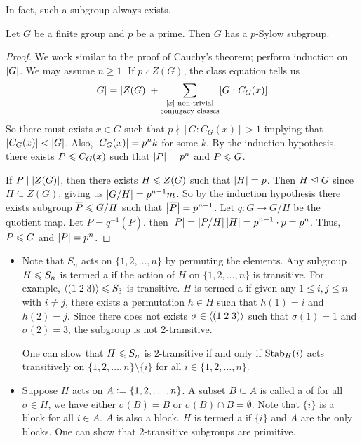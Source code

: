 In fact, such a subgroup always exists.

\begin{theorem}
    Let $G$ be a finite group and $p$ be a prime. Then $G$ has a $p$-Sylow subgroup.
\end{theorem}

\begin{proof}
    We work similar to the proof of Cauchy's theorem; perform induction on $\left| G \right|$. We may assume $n \geq 1$. If $p \nmid Z(G)$, the class equation tells us 
    \begin{align}
        \left| G \right| = \left| Z(G) \right| + \sum_{\substack{[x] \text{ non-trivial}\\ \text{conjugacy classes}}} [G:C_G(x)].
    \end{align}
    So there must exists $x \in G$ such that $p \nmid [G:C_G(x)] > 1$ implying that $\left| C_{G}(x) \right| < \left| G \right|$. Also, $\left| C_{G}(x) \right| = p^{n}k$ for some $k$. By the induction hypothesis, there exists $P \leqslant C_{G}(x)$ such that $\left| P \right| = p^{n}$ and $P \leqslant G$.

    If $P \mid \left| Z(G) \right|$, then there exists $H \leqslant Z(G)$ such that $\left| H \right| = p$. Then $H \trianglelefteq G$ since $H \subseteq Z(G)$, giving us $\left| G/H \right| = p^{n-1}m$. So by the induction hypothesis there exists subgroup $\overline{P} \leqslant G/H$ such that $\left| \overline{P} \right| = p^{n-1}$. Let $q:G \to G/H$ be the quotient map. Let $P = q^{-1}(\overline{P})$. then $\left| P \right| = \left| P/H \right|\left| H \right| = p^{n-1} \cdot p = p^{n}$. Thus, $P \leqslant G$ and $\left| P \right| = p^{n}$.
\end{proof}


\begin{remark}
    \begin{itemize}
        \item Note that $S_{n}$ acts on $\{1,2,\ldots,n\}$ by permuting the elements. Any subgroup $H \leqslant S_{n}$ is termed a  if the action of $H$ on $\{1,2,\ldots,n\}$ is transitive. For example, $\langle(1\;2\;3)\rangle \leqslant S_{3}$ is transitive. $H$ is termed a  if given any $1 \leq i,j \leq n$ with $i \neq j$, there exists a permutation $h \in H$ such that $h(1) = i$ and $h(2) = j$. Since there does not exists $\sigma \in \langle(1\;2\;3)\rangle$ such that $\sigma(1) = 1$ and $\sigma(2) = 3$, the subgroup is not 2-transitive.

        One can show that $H \leqslant S_{n}$ is 2-transitive if and only if $\operatorname{Stab}_{H}(i)$ acts transitively on $\{1,2,\ldots,n\} \setminus \{i\}$ for all $i \in \{1,2,\ldots,n\}$.


        \item Suppose $H$ acts on $A \vcentcolon= \{1,2,\ldots,n\}$. A subset $B \subseteq A$ is called a  of for all $\sigma \in H$, we have either $\sigma(B) = B$ or $\sigma(B) \cap B = \emptyset$. Note that $\{i\}$ is a block for all $i \in A$. $A$ is also a block. $H$ is termed a  if $\{i\}$ and $A$ are the only blocks. One can show that 2-transitive subgroups are primitive.
    \end{itemize}

\end{remark}